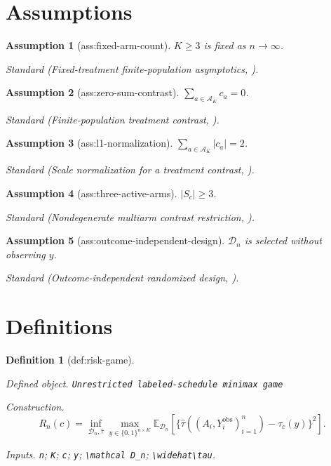 \documentclass{article}
\newtheorem{assumption}{Assumption}
\newtheorem{definition}{Definition}
\begin{document}
\section{Assumptions}

\begin{assumption}[ass:fixed-arm-count]\label{ass:fixed-arm-count}
\(K\ge3\) is fixed as \(n\to\infty\).
\par\smallskip\noindent\emph{Standard} (Fixed-treatment finite-population asymptotics, \cite{li_ding_2017_clt}).
\end{assumption}

\begin{assumption}[ass:zero-sum-contrast]\label{ass:zero-sum-contrast}
\(\sum_{a\in\mathcal A_K}c_a=0\).
\par\smallskip\noindent\emph{Standard} (Finite-population treatment contrast, \cite{mukerjee_dasgupta_rubin_2018}).
\end{assumption}

\begin{assumption}[ass:l1-normalization]\label{ass:l1-normalization}
\(\sum_{a\in\mathcal A_K}|c_a|=2\).
\par\smallskip\noindent\emph{Standard} (Scale normalization for a treatment contrast, \cite{mukerjee_dasgupta_rubin_2018}).
\end{assumption}

\begin{assumption}[ass:three-active-arms]\label{ass:three-active-arms}
\(|S_c|\ge3\).
\par\smallskip\noindent\emph{Standard} (Nondegenerate multiarm contrast restriction, \cite{mukerjee_dasgupta_rubin_2018}).
\end{assumption}

\begin{assumption}[ass:outcome-independent-design]\label{ass:outcome-independent-design}
\(\mathcal D_n\) is selected without observing \(y\).
\par\smallskip\noindent\emph{Standard} (Outcome-independent randomized design, \cite{sudijono_dobriban_tchetgen_2026_sharp}).
\end{assumption}

\section{Definitions}

\begin{definition}[def:risk-game]\label{def:risk-game}
\par\smallskip\noindent\emph{Defined object.} \texttt{Unrestricted labeled-\allowbreak{}schedule minimax game}
\par\smallskip\noindent\emph{Construction.} \[R_n(c)=\inf_{\mathcal D_n,\widehat\tau}\max_{y\in\{0,1\}^{n\times K}}\mathbb E_{\mathcal D_n}\!\left[\{\widehat\tau((A_i,Y_i^{\mathrm{obs}})_{i=1}^n)-\tau_c(y)\}^2\right].\]
\par\smallskip\noindent\emph{Inputs.} \texttt{n}; \texttt{K}; \texttt{c}; \texttt{y}; \texttt{\textbackslash{}\allowbreak{}mathcal D\_\allowbreak{}n}; \texttt{\textbackslash{}\allowbreak{}widehat\textbackslash{}\allowbreak{}tau}.
\end{definition}
\end{document}
